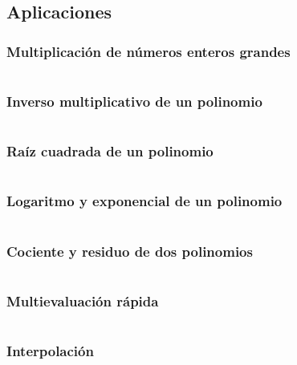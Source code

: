 \documentclass[11pt]{article}
\begin{document}
		\subsection{Aplicaciones}
			\subsubsection{Multiplicación de números enteros grandes}
			\inputminted[tabsize=2,breaklines,firstline=102,lastline=135,fontsize=\small]{c++}{fft.cpp}
			
			\subsubsection{Inverso multiplicativo de un polinomio}
			\inputminted[tabsize=2,breaklines,firstline=137,lastline=158,fontsize=\small]{c++}{fft.cpp}
			
			\subsubsection{Raíz cuadrada de un polinomio}
			\inputminted[tabsize=2,breaklines,firstline=160,lastline=181,fontsize=\small]{c++}{fft.cpp}
			
			\subsubsection{Logaritmo y exponencial de un polinomio}
			\inputminted[tabsize=2,breaklines,firstline=183,lastline=225,fontsize=\small]{c++}{fft.cpp}
			
			\subsubsection{Cociente y residuo de dos polinomios}
			\inputminted[tabsize=2,breaklines,firstline=227,lastline=252,fontsize=\small]{c++}{fft.cpp}
			
			\subsubsection{Multievaluación rápida}
			\inputminted[tabsize=2,breaklines,firstline=254,lastline=294,fontsize=\small]{c++}{fft.cpp}
			
			\subsubsection{Interpolación}
			\inputminted[tabsize=2,breaklines,firstline=296,lastline=320,fontsize=\small]{c++}{fft.cpp}
			
\end{document}
